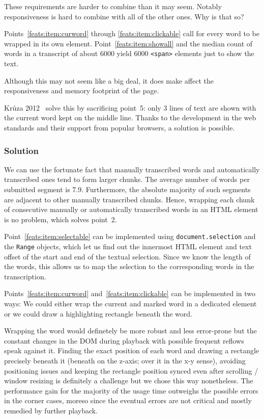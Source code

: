 \documentclass{svproc}
\begin{document}
These requirements are harder to combine than it may seem. Notably
responsiveness is hard to combine with all of the other ones. Why is that so?

Points~\ref{feats:item:curword} through \ref{feats:item:clickable}
call for every word to be wrapped in its own element.
Point~\ref{feats:item:showall} and the median count of words in a transcript of
about 6000 yield 6000 \texttt{<span>} elements just to show the text. 

Although this may not seem like a big deal, it does make affect the
responsiveness and memory footprint of the page.

Kr\r{u}za 2012~\cite{kruuza2012making} solve this by sacrificing point~5:
only 3
lines of text are shown with the current word kept on the middle line. Thanks to
the development in the web standards and their support from popular browsers, a
solution is possible.

\subsubsection{Solution}

We can use the fortunate fact that manually transcribed words and automatically
transcribed ones tend to form larger chunks. The average number of words per
submitted segment is 7.9. Furthermore, the absolute majority of such segments
are adjacent to other manually transcribed chunks. 
Hence, wrapping each chunk of consecutive manually or automatically transcribed
words in an HTML element is no problem, which solves
point~2.

Point~\ref{feats:item:selectable} can be implemented using
\texttt{document.selection} and the \texttt{Range} objects, which let us find
out the innermost HTML element and text offset of the start and end of the
textual selection. Since we know the length of the words, this allows us to map
the selection to the corresponding words in the transcription.

Points~\ref{feats:item:curword} and~\ref{feats:item:clickable} can be
implemented in two ways: We could either wrap the current and marked word in a
dedicated element or we could draw a highlighting rectangle beneath the word.

Wrapping the word would definetely be more robust and less error-prone but the
constant changes in the DOM during playback with possible frequent reflows speak
against it. Finding the exact position of each word and drawing a rectangle
precisely beneath it (beneath on the z-axis; over it in the x-y sense), avoiding
positioning issues and keeping the rectangle position synced even after scrolling
/ window resizing is definitely a challenge but we chose this way nonetheless.
The performance gain for the majority of the usage time outweighs the possible
errors in the corner cases, moreso since the eventual errors are not critical
and mostly remedied by further playback.
\end{document}
